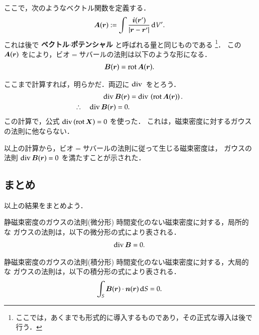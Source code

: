         ここで，次のようなベクトル関数を定義する．
            \begin{align}
                \boldsymbol{A}(\boldsymbol{r}) := \int \frac{ \boldsymbol{i}(\boldsymbol{r}') }{|\boldsymbol{r} - \boldsymbol{r}'|} \,\mathrm{d} V'.
            \end{align}
        これは後で \textbf{ベクトル$\cdot$ポテンシャル} と呼ばれる量と同じものである
            \footnote{
                ここでは，あくまでも形式的に導入するものであり，その正式な導入は後で行う．
            }．
        この $\boldsymbol{A}(\boldsymbol{r})$ をにより，ビオ$=$サバールの法則は以下のような形になる．
            \begin{align}
                \boldsymbol{B}(\boldsymbol{r}) = \mathrm{rot}\, \boldsymbol{A}(\boldsymbol{r}).
            \end{align}

        ここまで計算すれば，明らかだ．両辺に $\mathrm{div}\,$ をとろう．
            \begin{align}
                \mathrm{div}\, \boldsymbol{B}(\boldsymbol{r}) &= \mathrm{div}\, \left( \mathrm{rot}\, \boldsymbol{A}(\boldsymbol{r}) \right). \notag \\
                \therefore \quad
                \mathrm{div}\, \boldsymbol{B}(\boldsymbol{r}) = 0.
            \end{align}
        この計算で，公式 $\mathrm{div}\, (\mathrm{rot}\, \boldsymbol{X}) = 0$ を使った．
        これは，磁束密度に対するガウスの法則に他ならない．

        以上の計算から，ビオ$=$サバールの法則に従って生じる磁束密度は，
        ガウスの法則 $\mathrm{div}\, \boldsymbol{B}(\boldsymbol{r}) = 0$ を満たすことが示された．


    \subsection{まとめ}
        以上の結果をまとめよう．
                    \begin{myshadebox}{静磁束密度のガウスの法則(微分形)}
                        時間変化のない磁束密度に対する，局所的な
                        ガウスの法則は，以下の微分形の式により表される．
                        \begin{align}
                            \mathrm{div}\, \boldsymbol{B} =0.
                        \end{align}
                    \end{myshadebox}
                    \begin{myshadebox}{静磁束密度のガウスの法則(積分形)}
                        時間変化のない磁束密度に対する，大局的な
                        ガウスの法則は，以下の積分形の式により表される．
                        \begin{align}
                            \int_{S} \boldsymbol{B}(\boldsymbol{r}) \cdot \boldsymbol{n}(\boldsymbol{r})\,\mathrm{d} S=0.
                        \end{align}
                    \end{myshadebox}

